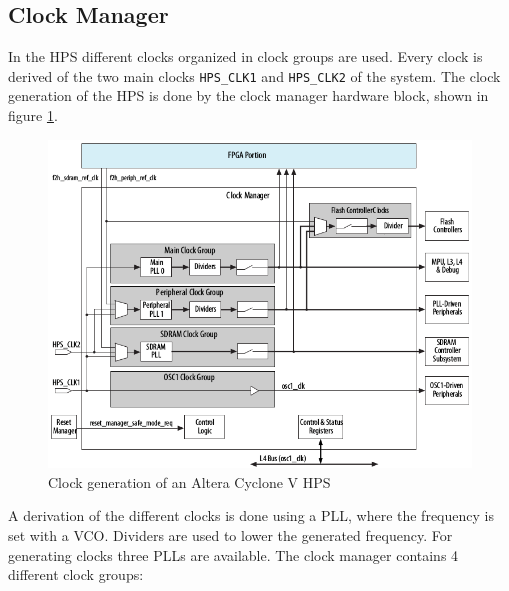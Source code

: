 \subsection{Clock Manager}
In the HPS different clocks organized in clock groups are used. Every clock is derived of the two main clocks \texttt{HPS\_CLK1} and \texttt{HPS\_CLK2} of the system. The clock generation of the HPS is done by the clock manager hardware block, shown in figure \ref{fig:hpsclockmanager}. 
\begin{figure}[htbp]
\begin{center}
\includegraphics[width=15cm,keepaspectratio=true]{bilder/png/hpsclockmanager}
\caption{Clock generation of an Altera Cyclone V HPS\cite{altcycvov15}}
\label{fig:hpsclockmanager}
\end{center}
\end{figure}
A derivation of the different clocks is done using a PLL, where the frequency is set with a VCO. Dividers are used to lower the generated frequency. For generating clocks three PLLs are available. The clock manager contains 4 different clock groups:
